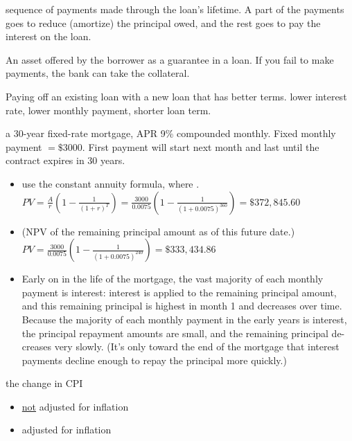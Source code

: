  sequence of payments made through the loan's lifetime. A part of the payments goes to
reduce (\ie amortize) the principal owed, and the rest goes to pay the interest on the loan.

 An asset offered by the borrower as a guarantee in a loan. If you fail to make payments, the bank can
take the collateral.

 Paying off an existing loan with a new loan that has better terms. \Eg lower interest rate, lower
monthly payment, shorter loan term.

\Green{\Eg} a 30-year fixed-rate mortgage, APR 9\% compounded monthly. Fixed monthly payment $= \$3000$. First payment
will start next month and last until the contract expires in 30 years.
\begin{itemize}
    \item {}
        use the constant annuity formula, where
        .
        $PV = \frac{A}{r} \left(1 - \frac{1}{(1+r)^T}\right) = \frac{3000}{0.0075} \left(1 - \frac{1}{(1+0.0075)^{360}}\right) = \mathdollar 372,845.60$
    \item {}
        (\ie NPV of the remaining principal amount as of this future date.)
        $PV = \frac{3000}{0.0075} \left(1 - \frac{1}{(1+0.0075)^{240}}\right) = \mathdollar 333,434.86$
    \item {}
         \Ie Early on in the life of the mortgage, the vast majority
        of each monthly payment is interest: interest is applied to the remaining principal amount, and this remaining
        principal is highest in month 1 and decreases over time. Because the majority of each monthly payment in the
        early years is interest, the principal repayment amounts are small, and the remaining principal de-creases very
        slowly. (It's only toward the end of the mortgage that interest payments decline enough to repay the principal
        more quickly.)
\end{itemize}

 the change in CPI 
\begin{itemize}
    \item {} \underline{not} adjusted for inflation
    \item {} adjusted for inflation
\end{itemize}


